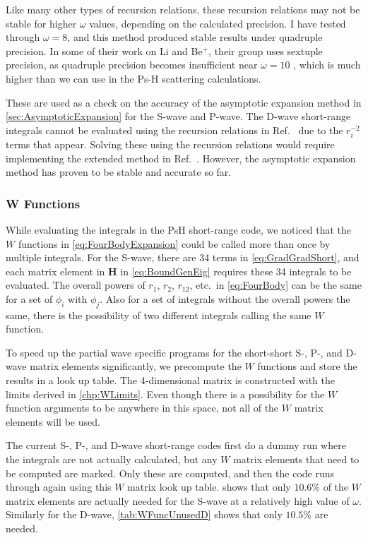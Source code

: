 \documentclass[Dissertation.tex]{subfiles}
\begin{document}
Like many other types of recursion relations, these recursion relations may 
not be stable for higher $\omega$ values, depending on the calculated 
precision. I have tested through $\omega = 8$, and this method produced 
stable results under quadruple precision. In some of their work on Li and
Be$^+$, their group uses sextuple precision, as quadruple precision becomes 
insufficient near $\omega = 10$ \cite{Puchalski2006}, which is much higher 
than we can use in the Ps-H scattering calculations.

These are used as a check on the accuracy of the asymptotic expansion method in
\cref{sec:AsymptoticExpansion} for the S-wave and P-wave. The D-wave short-range
integrals cannot be evaluated using the recursion relations in
Ref.~\cite{Pachucki2004} due to the $r_i^{-2}$ terms that appear. Solving these
using the recursion relations would require implementing the extended method in
Ref.~\cite{Pachucki2005}. However, the asymptotic expansion method has proven
to be stable and accurate so far.


\subsubsection{W Functions}
\label{sec:WFunctions}

While evaluating the integrals in the PsH short-range code, we noticed that the
$W$ functions in \cref{eq:FourBodyExpansion} could be called more than once by
multiple integrals. For the S-wave, there are 34 terms in \cref{eq:GradGradShort},
and each matrix element in \textbf{H} in \cref{eq:BoundGenEig} requires these 34
integrals to be evaluated. The overall powers of $r_1$, $r_2$, $r_{12}$, etc.\ in
\cref{eq:FourBody} can be the same for a set of $\phi_i$ with $\phi_j$. Also for a
set of integrals without the overall powers the same, there is the possibility of
two different integrals calling the same $W$ function.

To speed up the partial wave specific programs for the short-short
S-, P-, and D-wave matrix elements significantly, we precompute the $W$ functions
and store the results in a look up table. The 4-dimensional matrix is constructed
with the limits derived in \cref{chp:WLimits}. Even though there is a possibility
for the $W$ function arguments to be anywhere in this space, not all of the $W$
matrix elements will be used.

The current S-, P-, and D-wave short-range codes first do a dummy run
where the integrals are not actually calculated, but any $W$ matrix elements
that need to be computed are marked. Only these are computed, and then the code
runs through again using this $W$ matrix look up table. 
shows that only $10.6\%$ of the $W$ matrix elements are actually needed for the
S-wave at a relatively high value of $\omega$. Similarly for the D-wave,
\cref{tab:WFuncUnusedD} shows that only $10.5\%$ are needed.
\end{document}
